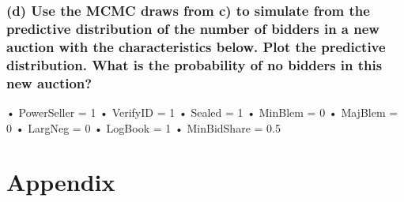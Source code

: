 \documentclass[]{article}
\begin{document}
\hypertarget{d-use-the-mcmc-draws-from-c-to-simulate-from-the-predictive-distribution-of-the-number-of-bidders-in-a-new-auction-with-the-characteristics-below.-plot-the-predictive-distribution.-what-is-the-probability-of-no-bidders-in-this-new-auction}{%
\subsubsection{(d) Use the MCMC draws from c) to simulate from the
predictive distribution of the number of bidders in a new auction with
the characteristics below. Plot the predictive distribution. What is the
probability of no bidders in this new
auction?}\label{d-use-the-mcmc-draws-from-c-to-simulate-from-the-predictive-distribution-of-the-number-of-bidders-in-a-new-auction-with-the-characteristics-below.-plot-the-predictive-distribution.-what-is-the-probability-of-no-bidders-in-this-new-auction}}

• PowerSeller = 1 • VerifyID = 1 • Sealed = 1 • MinBlem = 0 • MajBlem =
0 • LargNeg = 0 • LogBook = 1 • MinBidShare = 0.5

\hypertarget{appendix}{%
\section{Appendix}\label{appendix}}
\end{document}
